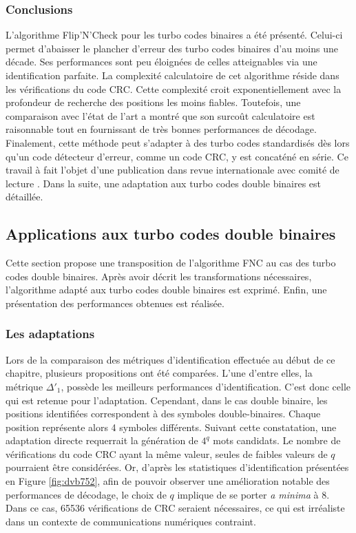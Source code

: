 \subsubsection{Conclusions}
L'algorithme Flip'N'Check pour les turbo codes binaires a été présenté. Celui-ci permet d'abaisser le plancher d'erreur 
des turbo codes binaires d'au moins une décade. Ses performances sont peu éloignées de celles atteignables via une 
identification parfaite. La complexité calculatoire de cet algorithme réside dans les vérifications du code CRC. Cette 
complexité croit exponentiellement avec la profondeur de recherche des positions les moins fiables. Toutefois, une 
comparaison avec l'état de l'art a montré que son surcoût calculatoire est raisonnable tout en fournissant de très bonnes 
performances de décodage. Finalement, cette méthode peut s'adapter à des turbo codes standardisés dès lors qu'un code 
détecteur d'erreur, comme un code CRC, y est concaténé en série. Ce travail à fait l'objet d'une publication dans revue
internationale avec comité de lecture . Dans la suite, une adaptation aux turbo codes double binaires est détaillée.


\subsection{Applications aux turbo codes double binaires}
Cette section propose une transposition de l'algorithme FNC au cas des turbo codes double binaires. Après avoir décrit 
les transformations nécessaires, l'algorithme adapté aux turbo codes double binaires est exprimé. Enfin, une présentation 
des performances obtenues est réalisée.
\subsubsection{Les adaptations}
Lors de la comparaison des métriques d'identification effectuée au début de ce chapitre, plusieurs propositions ont été 
comparées. L'une d'entre elles, la métrique $\Delta'_1$, possède les meilleurs performances d'identification. C'est donc
celle qui est retenue pour l'adaptation. Cependant, dans le cas double binaire, les positions identifiées correspondent 
à des symboles double-binaires. Chaque position représente alors 4 symboles différents. Suivant cette constatation, une adaptation directe 
requerrait la génération de $4^q$ mots candidats. Le nombre de vérifications du code CRC ayant la même valeur, 
seules de faibles valeurs de $q$ pourraient être considérées. Or, d'après les statistiques d'identification présentées en Figure 
\ref{fig:dvb752}, afin de pouvoir observer une amélioration notable des performances de décodage, le choix de $q$ implique 
de se porter \textit{a minima} à 8. Dans ce cas, 65536 vérifications de CRC seraient nécessaires, ce qui est 
irréaliste dans un contexte de communications numériques contraint.

